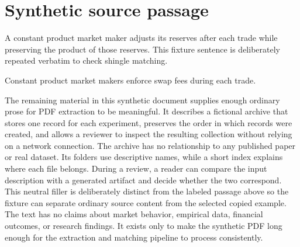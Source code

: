\documentclass[11pt]{article}
\begin{document}
\section*{Synthetic source passage}

A constant product market maker adjusts its reserves after each trade while
preserving the product of those reserves. This fixture sentence is deliberately
repeated verbatim to check shingle matching.

Constant product market makers enforce swap fees during each trade.

The remaining material in this synthetic document supplies enough ordinary prose for
PDF extraction to be meaningful. It describes a fictional archive that stores one
record for each experiment, preserves the order in which records were created, and
allows a reviewer to inspect the resulting collection without relying on a network
connection. The archive has no relationship to any published paper or real dataset.
Its folders use descriptive names, while a short index explains where each file belongs.
During a review, a reader can compare the input description with a generated artifact
and decide whether the two correspond. This neutral filler is deliberately distinct
from the labeled passage above so the fixture can separate ordinary source content from
the selected copied example. The text has no claims about market behavior, empirical
data, financial outcomes, or research findings. It exists only to make the synthetic
PDF long enough for the extraction and matching pipeline to process consistently.
\end{document}
